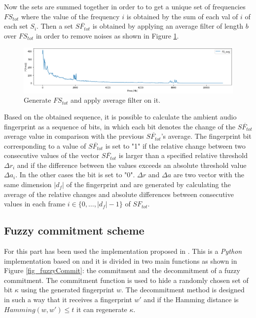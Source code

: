 Now the sets are summed together in order to to get a unique set of frequencies $FS_{tot}$ where the value  of the frequency $i$ is obtained by the sum of each val of $i$ of each set $S_i$.
Then a set $\overline{SF_{tot}}$ is obtained by applying an average filter of length $b$ over $FS_{tot}$ in order to remove noises as shown in Figure \ref{fig_spectrumsAVG}.

\begin{figure}[!h]
\centering
\includegraphics[width=6in]{images/spectrum_tot.PNG}
\caption{Generate $FS_{tot}$ and apply average  filter on it. }
\label{fig_spectrumsAVG}
\end{figure}

Based on the obtained sequence, it is possible to calculate the ambient audio fingerprint as a sequence of bits, in which each bit denotes the  change  of  the  $\overline{SF_{tot}}$  average value  in  comparison with  the  previous  $\overline{SF_{tot}}$'s  average.
The fingerprint bit corresponding to a value of $\overline{SF_{tot}}$ is set to "1" if the relative change between two consecutive values of the vector $\overline{SF_{tot}}$ is larger than a specified relative threshold $\Delta r_i$ and if the difference between the values exceeds an absolute threshold value $\Delta a_i$.
In the other cases the bit is set to "0".
$\Delta r$ and $\Delta a$ are two vector with the same dimension $|d_f|$ of the fingerprint and are generated by calculating the average of the relative changes  and absolute  differences between consecutive values in each frame $i \in \{0, \dots ,|d_f|-1 \}$ of $SF_{tot}$.

\subsection{Fuzzy commitment scheme}
For this part has been used the implementation proposed in \cite{fuzzyPairing}. 
This is a \textit{Python} implementation based on \cite{Juels2004AScheme} and it is divided in two main functions as shown in Figure \ref{fig_fuzzyCommit}: the commitment and the decommitment of a fuzzy commitment.
The commitment function is used to hide a randomly chosen set of bit $\kappa$ using the generated fingerprint $w$.
The decommitment method is designed in such a way that it receives a fingerprint $w'$ and if the Hamming distance is $Hamming(w , w') \leq t$ it can regenerate $\kappa$.

